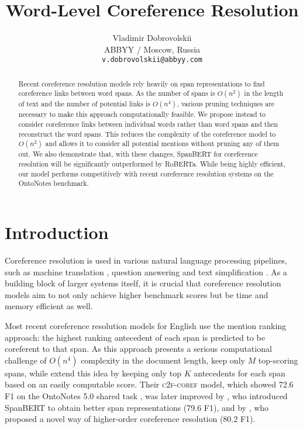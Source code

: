 \documentclass[11pt]{article}
\title{Word-Level Coreference Resolution}
\author{Vladimir Dobrovolskii \\
  ABBYY / Moscow, Russia \\
  \texttt{v.dobrovolskii@abbyy.com} \\ }
\begin{document}
\maketitle
\begin{abstract}
Recent coreference resolution models rely heavily on span representations to find coreference links between word spans. As the number of spans is $O(n^2)$ in the length of text and the number of potential links is $O(n^4)$, various pruning techniques are necessary to make this approach computationally feasible. We propose instead to consider coreference links between individual words rather than word spans and then reconstruct the word spans. This reduces the complexity of the coreference model to $O(n^2)$ and allows it to consider all potential mentions without pruning any of them out. We also demonstrate that, with these changes, SpanBERT for coreference resolution will be significantly outperformed by RoBERTa. While being highly efficient, our model performs competitively with recent coreference resolution systems on the OntoNotes benchmark.
\end{abstract}

\section{Introduction}
Coreference resolution is used in various natural language processing pipelines, such as machine translation \citep{ohtani-etal-2019-context, miculicich-werlen-popescu-belis-2017-using}, question answering \citep{dhingra-etal-2018-neural} and text simplification \citep{wilkens-etal-2020-coreference}. As a building block of larger systems itself, it is crucial that coreference resolution models aim to not only achieve higher benchmark scores but be time and memory efficient as well.

Most recent coreference resolution models for English use the mention ranking approach: the highest ranking antecedent of each span is predicted to be coreferent to that span.
As this approach presents a serious computational challenge of $O(n^4)$ complexity in the document length, \citet{lee-etal-2017-end} keep only $M$ top-scoring spans, while \citet{lee-etal-2018-higher} extend this idea by keeping only top $K$ antecedents for each span based on an easily computable score. Their \textsc{c2f-coref} model, which showed 72.6 F1 on the OntoNotes 5.0 shared task \citep{pradhan-etal-2012-conll}, was later improved by \citet{joshi-etal-2020-spanbert}, who introduced SpanBERT to obtain better span representations (79.6 F1), and by \citet{xu-choi-2020-revealing}, who proposed a novel way of higher-order coreference resolution (80.2 F1).
\end{document}
